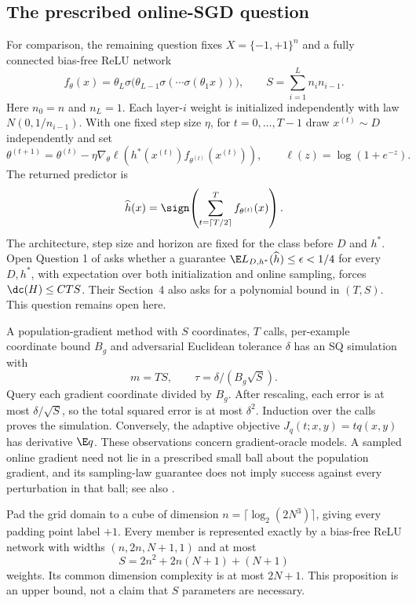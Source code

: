 \subsection{The prescribed online-SGD question}
For comparison, the remaining question fixes $X=\{-1,+1\}^n$ and a fully connected bias-free ReLU network
\[
 f_\theta(x)=\theta_L\sigma\bigl(\theta_{L-1}\sigma(\cdots\sigma(\theta_1x))\bigr),
 \qquad S=\sum_{i=1}^L n_i n_{i-1}.
\]
Here $n_0=n$ and $n_L=1$. Each layer-$i$ weight is initialized independently with law $N(0,1/n_{i-1})$. With one fixed step size $\eta$, for $t=0,\ldots,T-1$ draw $x^{(t)}\sim D$ independently and set
\[
 \theta^{(t+1)}=\theta^{(t)}-\eta\nabla_\theta
 \ell\!\left(h^*(x^{(t)})f_{\theta^{(t)}}(x^{(t)})\right),
 \qquad \ell(z)=\log(1+e^{-z}).
\]
The returned predictor is
\[
 \widehat h(x)=\sign\!\left(\sum_{t=\lceil T/2\rceil}^{T}f_{\theta^{(t)}}(x)\right).
\]
The architecture, step size and horizon are fixed for the class before $D$ and $h^*$. Open Question 1 of \citet[Section~2]{FKS26} asks whether a guarantee $\E L_{D,h^*}(\widehat h)\le\epsilon<1/4$ for every $D,h^*$, with expectation over both initialization and online sampling, forces $\dc(H)\le CTS$. Their Section~4 also asks for a polynomial bound in $(T,S)$. This question remains open here.

A population-gradient method with $S$ coordinates, $T$ calls, per-example coordinate bound $B_g$ and adversarial Euclidean tolerance $\delta$ has an SQ simulation with
\[
 m=TS,\qquad\tau=\delta/(B_g\sqrt S).
\]
Query each gradient coordinate divided by $B_g$. After rescaling, each error is at most $\delta/\sqrt S$, so the total squared error is at most $\delta^2$. Induction over the calls proves the simulation. Conversely, the adaptive objective $J_q(t;x,y)=tq(x,y)$ has derivative $\E q$. These observations concern gradient-oracle models. A sampled online gradient need not lie in a prescribed small ball about the population gradient, and its sampling-law guarantee does not imply success against every perturbation in that ball; see also \citet{FGV21,AKMSS21}.

\begin{proposition}\label{thm:network}
Pad the grid domain to a cube of dimension $n=\lceil\log_2(2N^3)\rceil$, giving every padding point label $+1$. Every member is represented exactly by a bias-free ReLU network with widths $(n,2n,N+1,1)$ and at most
\[
 S=2n^2+2n(N+1)+(N+1)
\]
weights. Its common dimension complexity is at most $2N+1$. This proposition is an upper bound, not a claim that $S$ parameters are necessary.
\end{proposition}

